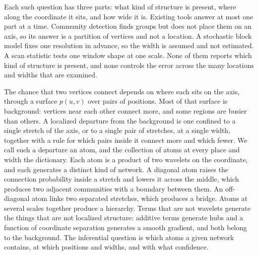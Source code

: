 \documentclass[11pt]{article}
\theoremstyle{definition}
\newcommand{\1}{\mathbf 1}\newcommand{\op}{\operatorname}
\begin{document}
Each such question has three parts: what kind of structure is present, where
along the coordinate it sits, and how wide it is.  Existing tools answer at
most one part at a time.  Community detection finds groups but does not place
them on an axis, so its answer is a partition of vertices and not a location.
A stochastic block model fixes one resolution in advance, so the width is
assumed and not estimated.  A scan statistic tests one window shape at one
scale.  None of them reports which kind of structure is present, and none
controls the error across the many locations and widths that are examined.

The chance that two vertices connect depends on where each sits on the axis,
through a surface $p(u,v)$ over pairs of positions.  Most of that surface is
background: vertices near each other connect more, and some regions are
busier than others.  A localized departure from the background is one
confined to a single stretch of the axis, or to a single pair of stretches, at
a single width, together with a rule for which pairs inside it connect more
and which fewer.  We call such a departure an atom, and the collection of
atoms at every place and width the dictionary.  Each atom is a product of two
wavelets on the coordinate, and each generates a distinct kind of network.  A diagonal atom raises the connection probability inside a
stretch and lowers it across the middle, which produces two adjacent
communities with a boundary between them.  An off-diagonal atom links two
separated stretches, which produces a bridge.  Atoms at several scales
together produce a hierarchy.  Terms that are not wavelets generate the things
that are not localized structure: additive terms generate hubs and a function
of coordinate separation generates a smooth gradient, and both belong to the
background.  The inferential question is which atoms a given network contains,
at which positions and widths, and with what confidence.
\end{document}
